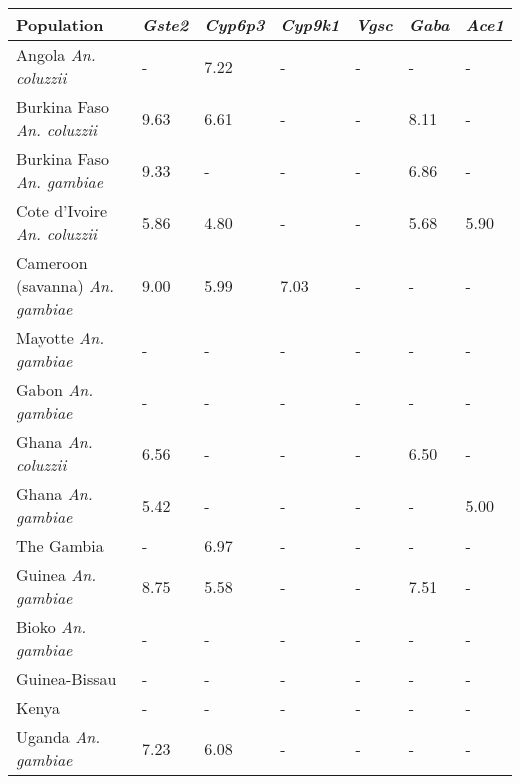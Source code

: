 \begin{tabular}{lllllll}
\toprule
                              Population & \textit{Gste2} & \textit{Cyp6p3} & \textit{Cyp9k1} & \textit{Vgsc} & \textit{Gaba} & \textit{Ace1} \\
\midrule
            Angola \textit{An. coluzzii} &              - &            7.22 &               - &             - &             - &             - \\
      Burkina Faso \textit{An. coluzzii} &           9.63 &            6.61 &               - &             - &          8.11 &             - \\
       Burkina Faso \textit{An. gambiae} &           9.33 &               - &               - &             - &          6.86 &             - \\
     Cote d'Ivoire \textit{An. coluzzii} &           5.86 &            4.80 &               - &             - &          5.68 &          5.90 \\
 Cameroon (savanna) \textit{An. gambiae} &           9.00 &            5.99 &            7.03 &             - &             - &             - \\
            Mayotte \textit{An. gambiae} &              - &               - &               - &             - &             - &             - \\
              Gabon \textit{An. gambiae} &              - &               - &               - &             - &             - &             - \\
             Ghana \textit{An. coluzzii} &           6.56 &               - &               - &             - &          6.50 &             - \\
              Ghana \textit{An. gambiae} &           5.42 &               - &               - &             - &             - &          5.00 \\
                              The Gambia &              - &            6.97 &               - &             - &             - &             - \\
             Guinea \textit{An. gambiae} &           8.75 &            5.58 &               - &             - &          7.51 &             - \\
              Bioko \textit{An. gambiae} &              - &               - &               - &             - &             - &             - \\
                           Guinea-Bissau &              - &               - &               - &             - &             - &             - \\
                                   Kenya &              - &               - &               - &             - &             - &             - \\
             Uganda \textit{An. gambiae} &           7.23 &            6.08 &               - &             - &             - &             - \\
\bottomrule
\end{tabular}
